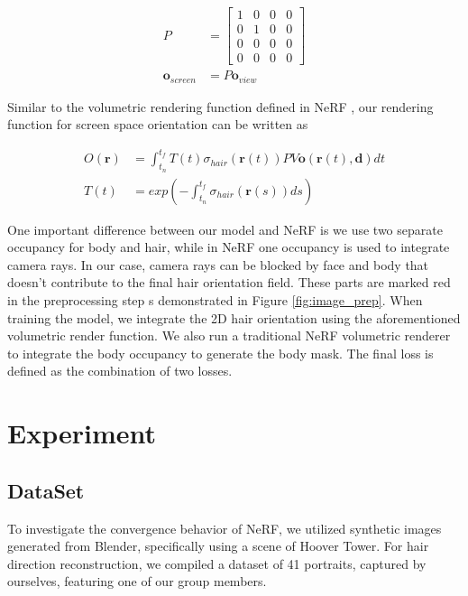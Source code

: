 \documentclass[12pt]{article}
\begin{document}
    \begin{align}
        P &= \begin{bmatrix}
            1 & 0 & 0 & 0 \\
            0 & 1 & 0 & 0 \\
            0 & 0 & 0 & 0 \\
            0 & 0 & 0 & 0
        \end{bmatrix} \\
        \mathbf{o}_{screen} &= P\mathbf{o}_{view}
    \end{align}

    Similar to the volumetric rendering function defined in NeRF \cite{mildenhall_nerf_2020}, our rendering function for screen space orientation can be written as

    \begin{align}
        O(\mathbf{r}) &= \int_{t_{n}}^{t_{f}} T(t) \sigma_{hair}(\mathbf{r}(t)) P V \mathbf{o}(\mathbf{r}(t), \mathbf{d}) dt \\
        T(t) &= exp(-\int_{t_{n}}^{t_{f}} \sigma_{hair}(\mathbf{r}(s)) ds)
    \end{align}

    One important difference between our model and NeRF is we use two separate occupancy for body and hair, while in NeRF one occupancy is used to integrate camera rays. In our case, camera rays can be blocked by face and body that doesn't contribute to the final hair orientation field. These parts are marked red in the preprocessing step s demonstrated in Figure \ref{fig:image_prep}. When training the model, we integrate the 2D hair orientation using the aforementioned volumetric render function. We also run a traditional NeRF volumetric renderer to integrate the body occupancy to generate the body mask. The final loss is defined as the combination of two losses.
    
  \section{Experiment}

  \subsection{DataSet}

  To investigate the convergence behavior of NeRF, we utilized synthetic images generated from Blender, specifically using a scene of Hoover Tower. For hair direction reconstruction, we compiled a dataset of 41 portraits, captured by ourselves, featuring one of our group members.
\end{document}
